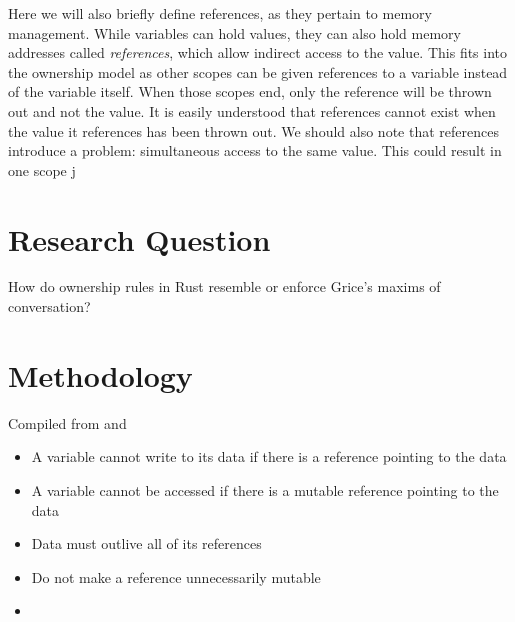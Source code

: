 \documentclass[12pt]{article}
\begin{document}
    Here we will also briefly define references, as they pertain to memory
    management. While variables can hold values, they can also hold memory
    addresses called \textit{references}, which allow indirect access to the
    value. This fits into the ownership model as other scopes can be given
    references to a variable instead of the variable itself. When those scopes
    end, only the reference will be thrown out and not the value. It is
    easily understood that references cannot exist when the value it
    references has been thrown out. We should also note that references
    introduce a problem: simultaneous access to the same value. This could
    result in one scope j
    \section*{Research Question}
    How do ownership rules in Rust resemble or enforce Grice's maxims of
    conversation?
    \section*{Methodology}
    Compiled from \textcite{rust_ownership} and \textcite{rust_references}
    \begin{itemize}
        \item A variable cannot write to its data if there is a reference
            pointing to the data
        \item A variable cannot be accessed if there is a mutable reference
            pointing to the data
        \item Data must outlive all of its references
        \item Do not make a reference unnecessarily mutable
        \item 
    \end{itemize}
    \newpage
    \printbibliography
\end{document}
